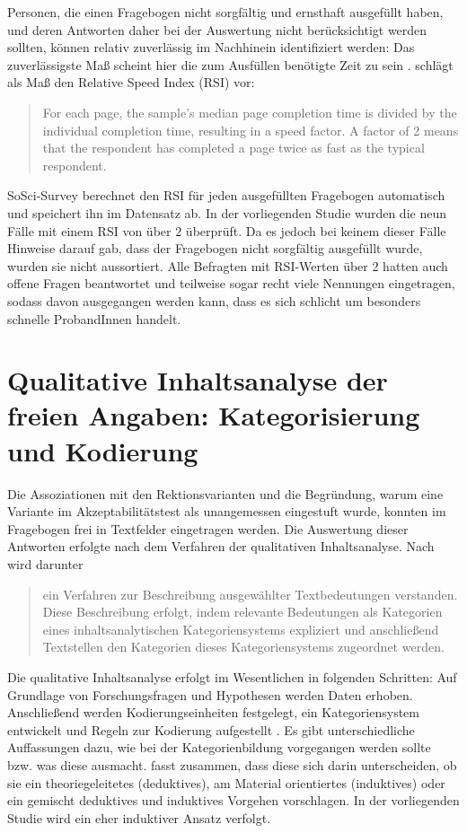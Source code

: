 Personen, die einen Fragebogen nicht sorgfältig und ernsthaft ausgefüllt haben, und deren Antworten daher bei der Auswertung nicht berücksichtigt werden sollten, können relativ zuverlässig im Nachhinein identifiziert werden: Das zuverlässigste Maß scheint hier die zum Ausfüllen benötigte Zeit zu sein \citep[s.][]{Leiner.2019}. \citet{Leiner.2019} schlägt als Maß den Relative Speed Index (RSI) vor: 
\begin{quote} For each page, the sample's median page completion time is divided by the individual completion time, resulting in a speed factor. A factor of 2 means that the respondent has completed a page twice as fast as the typical respondent.~\citep[236]{Leiner.2019} 
\end{quote}
SoSci-Survey berechnet den RSI für jeden ausgefüllten Fragebogen automatisch und speichert ihn im Datensatz ab. In der vorliegenden Studie wurden die neun Fälle mit einem RSI von über 2 überprüft. Da es jedoch bei keinem dieser Fälle Hinweise darauf gab, dass der Fragebogen nicht sorgfältig ausgefüllt wurde, wurden sie nicht aussortiert. Alle Befragten mit RSI-Werten über 2 hatten auch offene Fragen beantwortet und teilweise sogar recht viele Nennungen eingetragen, sodass davon ausgegangen werden kann, dass es sich schlicht um besonders schnelle ProbandInnen handelt. 
\section[Qualitative Inhaltsanalyse der freien Angaben]{Qualitative Inhaltsanalyse der freien Angaben: Kategorisierung und Kodierung}
\label{sec:Kategorisierung}
Die Assoziationen mit den Rektionsvarianten und die Begründung, warum eine Variante im Akzeptabilitätstest als unangemessen eingestuft wurde, konnten im Fragebogen frei in Textfelder eingetragen werden. Die Auswertung dieser Antworten erfolgte nach dem Verfahren der qualitativen Inhaltsanalyse. 
Nach \citet[][]{Schreier.2014} wird darunter
\begin{quote}
ein Verfahren zur Beschreibung ausgewählter Textbedeutungen verstanden. Diese Beschreibung erfolgt, indem relevante Bedeutungen als Kategorien eines inhaltsanalytischen Kategoriensystems expliziert und anschließend Textstellen den Kategorien dieses Kategoriensystems zugeordnet werden. \citep[5]{Schreier.2014}
\end{quote} 
Die qualitative Inhaltsanalyse erfolgt im Wesentlichen in folgenden Schritten: Auf Grundlage von Forschungsfragen und Hypothesen werden Daten erhoben. Anschließend werden Kodierungseinheiten festgelegt, ein Kategoriensystem entwickelt und Regeln zur Kodierung aufgestellt \citep[s.][49]{Kuckartz.2014}. Es gibt unterschiedliche Auffassungen dazu, wie bei der Kategorienbildung vorgegangen werden sollte bzw. was diese ausmacht.
\citet[2]{Schreier.2014} fasst zusammen, dass diese sich darin unterscheiden, ob sie ein theoriegeleitetes (deduktives), am Material orientiertes (induktives) oder ein gemischt deduktives und induktives Vorgehen vorschlagen. 
In der vorliegenden Studie wird ein eher induktiver Ansatz verfolgt. 


